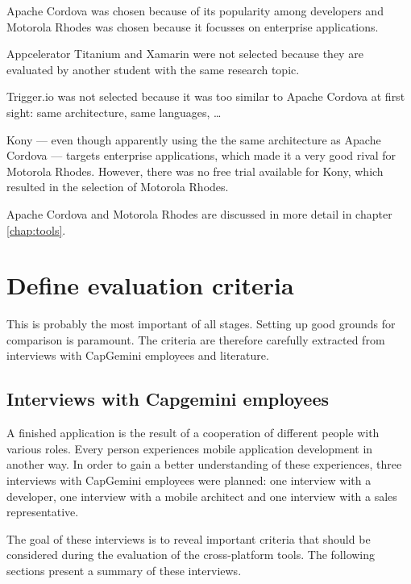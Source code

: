 Apache Cordova was chosen because of its popularity among developers and Motorola Rhodes was chosen because it focusses on enterprise applications. 

Appcelerator Titanium and Xamarin were not selected because they are evaluated by another student with the same research topic. 

Trigger.io was not selected because it was too similar to Apache Cordova at first sight: same architecture, same languages, \ldots


Kony --- even though apparently using the the same architecture as Apache Cordova --- targets enterprise applications, which made it a very good rival for Motorola Rhodes. However, there was no free trial available for Kony, which resulted in the selection of Motorola Rhodes.

Apache Cordova and Motorola Rhodes are discussed in more detail in chapter \ref{chap:tools}.

\section{Define evaluation criteria}

This is probably the most important of all stages. Setting up good grounds for comparison is paramount. The criteria are therefore carefully extracted from interviews with CapGemini employees and literature.

\subsection{Interviews with Capgemini employees}
\label{sec:interviews}

A finished application is the result of a cooperation of different people with various roles. Every person experiences mobile application development in another way. In order to gain a better understanding of these experiences, three interviews with CapGemini employees were planned: one interview with a developer, one interview with a mobile architect and one interview with a sales representative. 

The goal of these interviews is to reveal important criteria that should be considered during the evaluation of the cross-platform tools. The following sections present a summary of these interviews.

